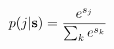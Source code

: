 \vspace{-0.1cm}
\begin{equation}
    p(j|\mathbf{s}) = \frac{e^{s_j}}{\sum_{k} e^{s_k}}
    \label{eq:softmax}
    \vspace{-0.05cm}
\end{equation}
